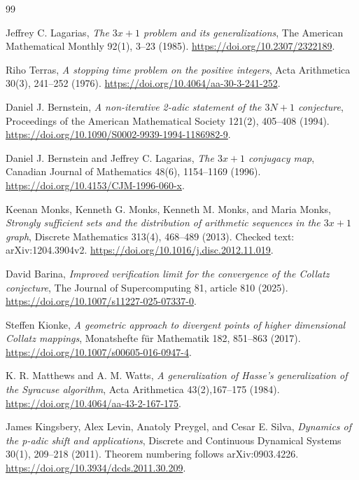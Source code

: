\begin{thebibliography}{99}
\setlength{\itemsep}{1.5pt plus .5pt minus .5pt}
Jeffrey C. Lagarias,
\emph{The $3x+1$ problem and its generalizations},
The American Mathematical Monthly 92(1), 3--23 (1985).
\url{https://doi.org/10.2307/2322189}.

Riho Terras,
\emph{A stopping time problem on the positive integers},
Acta Arithmetica 30(3), 241--252 (1976).
\url{https://doi.org/10.4064/aa-30-3-241-252}.

Daniel J. Bernstein,
\emph{A non-iterative 2-adic statement of the $3N+1$ conjecture},
Proceedings of the American Mathematical Society 121(2), 405--408 (1994).
\url{https://doi.org/10.1090/S0002-9939-1994-1186982-9}.

Daniel J. Bernstein and Jeffrey C. Lagarias,
\emph{The $3x+1$ conjugacy map},
Canadian Journal of Mathematics 48(6), 1154--1169 (1996).
\url{https://doi.org/10.4153/CJM-1996-060-x}.

Keenan Monks, Kenneth G. Monks, Kenneth M. Monks, and Maria Monks,
\emph{Strongly sufficient sets and the distribution of arithmetic sequences in the $3x+1$ graph},
Discrete Mathematics 313(4), 468--489 (2013). Checked text: arXiv:1204.3904v2.
\url{https://doi.org/10.1016/j.disc.2012.11.019}.

David Barina,
\emph{Improved verification limit for the convergence of the Collatz conjecture},
The Journal of Supercomputing 81, article 810 (2025).
\url{https://doi.org/10.1007/s11227-025-07337-0}.

Steffen Kionke,
\emph{A geometric approach to divergent points of higher dimensional Collatz mappings},
Monatshefte f\"{u}r Mathematik 182, 851--863 (2017).
\url{https://doi.org/10.1007/s00605-016-0947-4}.

K. R. Matthews and A. M. Watts,
\emph{A generalization of Hasse's generalization of the Syracuse algorithm},
Acta Arithmetica 43(2),167--175 (1984).
\url{https://doi.org/10.4064/aa-43-2-167-175}.

James Kingsbery, Alex Levin, Anatoly Preygel, and Cesar E. Silva,
\emph{Dynamics of the p-adic shift and applications},
Discrete and Continuous Dynamical Systems 30(1), 209--218 (2011). Theorem numbering follows arXiv:0903.4226.
\url{https://doi.org/10.3934/dcds.2011.30.209}.


\end{thebibliography}
